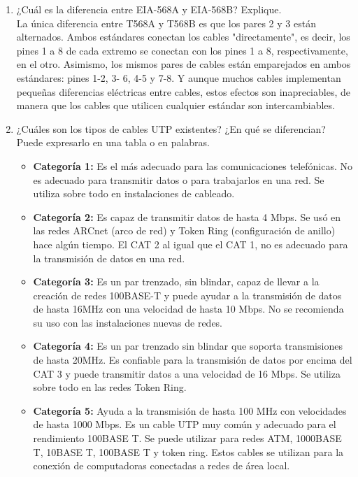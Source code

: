 \documentclass{article}
\begin{document}
\begin{enumerate}
\item¿Cuál es la diferencia entre EIA-568A y EIA-568B? Explique. \\
\newline La única diferencia entre T568A y T568B es que los pares 2 y 3 están alternados. Ambos estándares conectan los cables "directamente", es decir, los pines 1 a 8 de cada extremo se conectan con los pines 1 a 8, respectivamente, en el otro. Asimismo, los mismos pares de cables están emparejados en ambos estándares: pines 1-2, 3- 6, 4-5 y 7-8. Y aunque muchos cables implementan pequeñas diferencias eléctricas entre cables, estos efectos son inapreciables, de manera que los cables que utilicen cualquier estándar son intercambiables.\\

\item¿Cuáles son los tipos de cables UTP existentes? ¿En qué se diferencian? Puede expresarlo en una tabla o en palabras.\\
\begin{itemize} 
\item \textbf{ Categoría 1:}
Es el más adecuado para las comunicaciones telefónicas. No es adecuado para transmitir datos o para trabajarlos en una red. Se utiliza sobre todo en instalaciones de cableado.

\item \textbf{ Categoría 2:}
Es capaz de transmitir datos de hasta 4 Mbps. Se usó en las redes ARCnet (arco de red) y Token Ring (configuración de anillo) hace algún tiempo. El CAT 2 al igual que el CAT 1, no es adecuado para la transmisión de datos en una red.

\item \textbf{ Categoría 3:}
Es un par trenzado, sin blindar, capaz de llevar a la creación de redes 100BASE-T y puede ayudar a la transmisión de datos de hasta 16MHz con una velocidad de hasta 10 Mbps. No se recomienda su uso con las instalaciones nuevas de redes.

\item \textbf{ Categoría 4:}
Es un par trenzado sin blindar que soporta transmisiones de hasta 20MHz. Es confiable para la transmisión de datos por encima del CAT 3 y puede transmitir datos a una velocidad de 16 Mbps. Se utiliza sobre todo en las redes Token Ring.

\item \textbf{Categoría 5:}
Ayuda a la transmisión de hasta 100 MHz con velocidades de hasta 1000 Mbps. Es un cable UTP muy común y adecuado para el rendimiento 100BASE T. Se puede utilizar para redes ATM, 1000BASE T, 10BASE T, 100BASE T y token ring. Estos cables se utilizan para la conexión de computadoras conectadas a redes de área local.


\end{itemize}
\end{enumerate}
\end{document}
